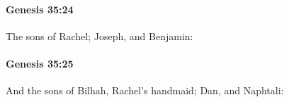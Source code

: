 		\paragraph{Genesis 35:24} %
			\label{GENESIS-35-24}

			The sons of Rachel; Joseph, and Benjamin:


		\paragraph{Genesis 35:25} %
			\label{GENESIS-35-25}

			And the sons of Bilhah, Rachel's handmaid; Dan, and Naphtali:


